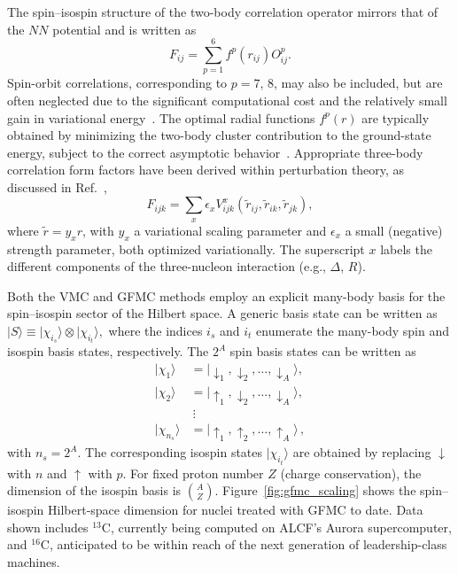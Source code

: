 The spin--isospin structure of the two-body correlation operator mirrors that of the $NN$ potential and is written as
\begin{equation}
F_{ij} = \sum_{p=1}^{6} f^{p}(r_{ij}) O^{p}_{ij} .
\end{equation}
Spin-orbit correlations, corresponding to $p=7$, $8$, may also be included, but are often neglected due to the significant computational cost and the relatively small gain in variational energy~\cite{lonardoni_variational_2017}. The optimal radial functions $f^{p}(r)$ are typically obtained by minimizing the two-body cluster contribution to the ground-state energy, subject to the correct asymptotic behavior~\cite{lomnitz-adler_monte_1981}.
Appropriate three-body correlation form factors have been derived within perturbation theory, as discussed in Ref.~\cite{carlson_quantum_2015},
\begin{equation}
F_{ijk} = \sum_x \epsilon_x V_{ijk}^x(\tilde r_{ij}, \tilde r_{ik}, \tilde r_{jk}) ,
\label{eq:three_body_corr}
\end{equation}
where $\tilde r = y_x r$, with $y_x$ a variational scaling parameter and $\epsilon_x$ a small (negative) strength parameter, both optimized variationally. The superscript $x$ labels the different components of the three-nucleon interaction (e.g., $\Delta$, $R$).


Both the VMC and GFMC methods employ an explicit many-body basis for the
spin--isospin sector of the Hilbert space. A generic basis state can be written as $|S\rangle \equiv |\chi_{i_s}\rangle \otimes |\chi_{i_t}\rangle, $
where the indices $i_s$ and $i_t$ enumerate the many-body spin and isospin basis states, respectively. The $2^A$ spin basis states can be written as
\begin{align}
|\chi_1\rangle &= |\downarrow_1, \downarrow_2,\dots,\downarrow_A\rangle \nonumber, \\
|\chi_2\rangle &= |\uparrow_1, \downarrow_2,\dots,\downarrow_A\rangle \nonumber, \\
& \  \vdots \nonumber\\
|\chi_{n_s}\rangle &= |\uparrow_1, \uparrow_2,\dots,\uparrow_A\rangle\,,
\end{align}
with $n_s = 2^A$. The corresponding isospin states $|\chi_{i_t}\rangle$ are
obtained by replacing $\downarrow$ with $n$ and $\uparrow$ with $p$.
For fixed proton number $Z$ (charge conservation), the dimension of the isospin basis is $\binom{A}{Z}$.
Figure~\ref{fig:gfmc_scaling} shows the spin--isospin Hilbert-space dimension for nuclei treated with GFMC to date. Data shown includes $^{13}$C, currently being computed on ALCF’s Aurora supercomputer, and $^{16}$C, anticipated to be within reach of the next generation of leadership-class machines.

